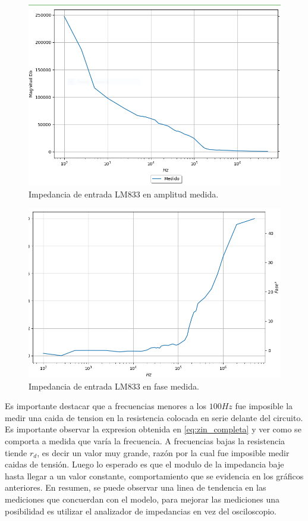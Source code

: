 \begin{figure}[H]	
	\centering
	\includegraphics[width=\textwidth]{Ejercicio2/Imagenes/Zin_A_LM833_Medido.png}
	\caption{Impedancia de entrada LM833 en amplitud medida.}
\end{figure}

\begin{figure}[H]	
	\centering
	\includegraphics[width=\textwidth]{Ejercicio2/Imagenes/Zin_F_LM833_Medido.png}
	\caption{Impedancia de entrada LM833 en fase medida.}
\end{figure}

Es importante destacar que a frecuencias menores a los $100 Hz$ fue imposible la medir una caida de tension en la resistencia colocada en serie delante del circuito. Es importante observar la expresion obtenida en \ref{eq:zin_completa} y ver como se comporta a medida que varía la frecuencia. A frecuencias bajas la resistencia tiende $r_d$, es decir un valor muy grande, razón por la cual fue imposible medir caidas de tensión. Luego lo esperado es que el modulo de la impedancia baje hasta llegar a un valor constante, comportamiento que se evidencia en los gráficos anteriores. En resumen, se puede observar una linea de tendencia en las mediciones que concuerdan con el modelo, para mejorar las mediciones una posibilidad es utilizar el analizador de impedancias en vez del osciloscopio.


